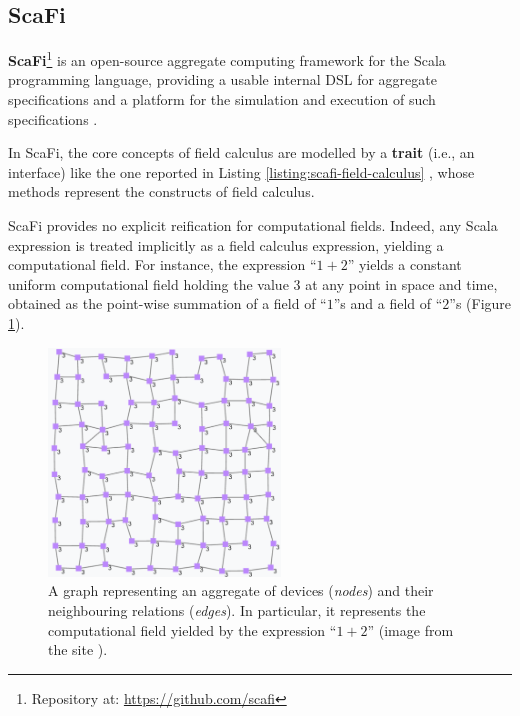 
\subsection{ScaFi}
\label{section:background:technologies:scafi}

\textbf{\ac{ScaFi}}\footnote{Repository at: \url{https://github.com/scafi}} is an
open-source aggregate computing framework for the Scala programming language,
providing a usable internal \ac{DSL} for aggregate specifications and a
platform for the simulation and execution of such specifications
\cite{ScaFi-Documentation}.

In \ac{ScaFi}, the core concepts of field calculus are modelled by a
\textbf{trait} (i.e., an interface) like the one reported in Listing
\ref{listing:scafi-field-calculus} \cite{FieldCalculus-AggregateComputing},
whose methods represent the constructs of field calculus.



\ac{ScaFi} provides no explicit reification for computational fields. Indeed,
any Scala expression is treated implicitly as a field calculus expression,
yielding a computational field. For instance, the expression \enquote{$1+2$}
yields a constant uniform computational field holding the value $3$ at any point
in space and time, obtained as the point-wise summation of a field of
\enquote{$1$}s and a field of \enquote{$2$}s (Figure
\ref{figure:constant-uniform-field}).

\begin{figure}[h]
  \centering
  \includegraphics[width=0.55\textwidth]{resources/figures/constant-uniform-field.png}
  \caption{
    A graph representing an aggregate of devices (\textit{nodes}) and their
    neighbouring relations (\textit{edges}). In particular, it represents the
    computational field yielded by the expression \enquote{$1+2$}
    (image from the site \cite{ScaFi-Documentation}).
  }
  \label{figure:constant-uniform-field}
\end{figure}

